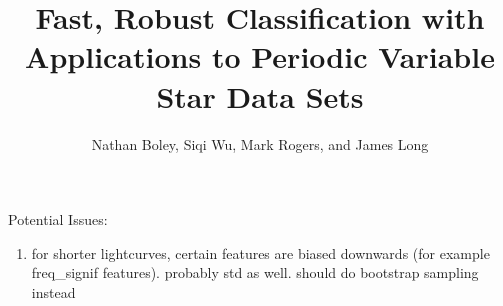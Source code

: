 \documentclass[11pt]{article}
\begin{document}
\title{Fast, Robust Classification with Applications to Periodic Variable Star Data Sets}
\author{Nathan Boley, Siqi Wu, Mark Rogers, and James Long}
\maketitle

Potential Issues:
\begin{enumerate}
\item for shorter lightcurves, certain features are biased downwards (for example freq\_signif features). probably std as well. should do bootstrap sampling instead
\end{enumerate}
\end{document}
